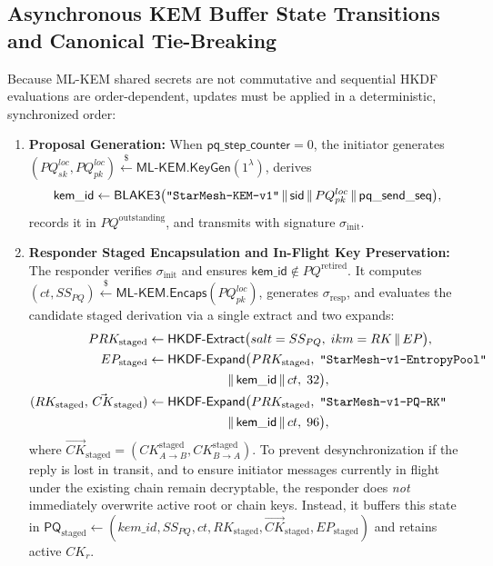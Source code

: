 \documentclass[11pt,a4paper]{article}
\theoremstyle{remark}
\theoremstyle{plain}
\newcommand{\getsr}{\stackrel{\$}{\leftarrow}}
\newcommand{\MLKEM}{\mathsf{ML\text{-}KEM}}
\newcommand{\HKDFExtract}{\mathsf{HKDF\text{-}Extract}}
\newcommand{\HKDFExpand}{\mathsf{HKDF\text{-}Expand}}
\newcommand{\Encaps}{\mathsf{Encaps}}
\newcommand{\KeyGen}{\mathsf{KeyGen}}
\newcommand{\strlit}[1]{\text{\upshape\texttt{"#1"}}}
\begin{document}
\subsection{Asynchronous KEM Buffer State Transitions and Canonical Tie-Breaking}
Because ML-KEM shared secrets are not commutative and sequential HKDF evaluations are order-dependent, updates must be applied in a deterministic, synchronized order:
\begin{enumerate}
  \item \textbf{Proposal Generation:} When $\mathsf{pq\_step\_counter} = 0$, the initiator generates $(PQ^{loc}_{sk}, PQ^{loc}_{pk}) \getsr \MLKEM.\KeyGen(1^\lambda)$, derives
    \[
      \mathsf{kem\_id} \gets \mathsf{BLAKE3}\bigl(\strlit{StarMesh-KEM-v1} \,\|\, \mathsf{sid} \,\|\, PQ^{loc}_{pk} \,\|\, \mathsf{pq\_send\_seq}\bigr),
    \]
    records it in $PQ^{\mathrm{outstanding}}$, and transmits with signature $\sigma_{\mathrm{init}}$.
  \item \textbf{Responder Staged Encapsulation and In-Flight Key Preservation:} The responder verifies $\sigma_{\mathrm{init}}$ and ensures $\mathsf{kem\_id} \notin PQ^{\mathrm{retired}}$. It computes $(ct, SS_{PQ}) \getsr \MLKEM.\Encaps(PQ^{loc}_{pk})$, generates $\sigma_{\mathrm{resp}}$, and evaluates the candidate staged derivation via a single extract and two expands:
    \begin{align*}
      PRK_{\mathrm{staged}} &\gets \HKDFExtract\bigl(salt = SS_{PQ},\; ikm = RK \,\|\, EP\bigr), \\
      EP_{\mathrm{staged}} &\gets \HKDFExpand\bigl(PRK_{\mathrm{staged}},\; \strlit{StarMesh-v1-EntropyPool} \\
                           &\qquad\qquad\qquad\;\|\, \mathsf{kem\_id} \,\|\, ct,\; 32\bigr), \\
      (RK_{\mathrm{staged}},\, \vec{CK}_{\mathrm{staged}}) &\gets \HKDFExpand\bigl(PRK_{\mathrm{staged}},\; \strlit{StarMesh-v1-PQ-RK} \\
                           &\qquad\qquad\qquad\;\|\, \mathsf{kem\_id} \,\|\, ct,\; 96\bigr),
    \end{align*}
    where $\vec{CK}_{\mathrm{staged}} = (CK_{A\to B}^{\mathrm{staged}}, CK_{B\to A}^{\mathrm{staged}})$.
    To prevent desynchronization if the reply is lost in transit, and to ensure initiator messages currently in flight under the existing chain remain decryptable, the responder does \emph{not} immediately overwrite active root or chain keys. Instead, it buffers this state in $\mathsf{PQ}_{\mathrm{staged}} \leftarrow (kem\_id, SS_{PQ}, ct, RK_{\mathrm{staged}}, \vec{CK}_{\mathrm{staged}}, EP_{\mathrm{staged}})$ and retains active $CK_r$.

\end{enumerate}
\end{document}
